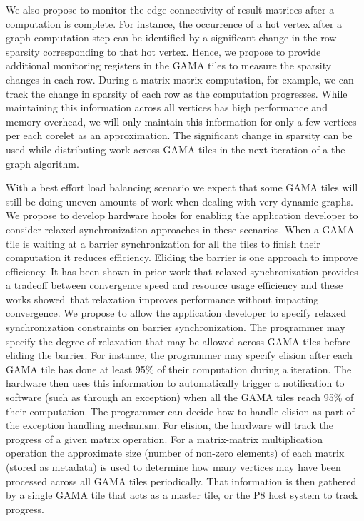 We also propose to monitor the edge connectivity of result matrices after a computation is complete. For instance, the occurrence of a hot vertex after a graph computation step can be identified by a significant change in the row sparsity corresponding to that hot vertex. Hence, we propose to provide additional monitoring registers in the GAMA tiles to measure the sparsity changes in each row. During a matrix-matrix computation, for example, we can track the change in sparsity of each row as the computation progresses. While maintaining this information across all vertices has high performance and memory overhead, we will only maintain this information for only a few vertices per each corelet as an approximation. The significant change in sparsity can be used while distributing work across GAMA tiles in the next iteration of a the graph algorithm.    

With a best effort load balancing scenario we expect that some GAMA tiles  will still be doing uneven amounts of work when dealing with very dynamic graphs.  We  propose to develop hardware hooks for enabling the application developer to consider relaxed synchronization approaches in these scenarios. When a GAMA tile is waiting at a barrier synchronization for all the tiles to finish their computation it reduces efficiency. Eliding the barrier is one approach to  improve efficiency. It has been shown in prior work that relaxed synchronization provides a tradeoff between convergence speed and resource usage efficiency and these works showed that relaxation improves performance without impacting  convergence.  We propose to allow the application developer to specify relaxed synchronization constraints on barrier synchronization. The programmer may specify the degree of relaxation that may be allowed across GAMA tiles before eliding the barrier. For instance, the programmer may specify elision after each GAMA tile has done at least 95\% of their computation during a iteration. The hardware then uses this information to automatically trigger a notification to software (such as through an exception) when all the GAMA tiles reach 95\% of their computation. The programmer can decide how to handle elision as part of the exception handling mechanism.  For elision, the hardware will track the progress of a given matrix operation. For a matrix-matrix multiplication operation the approximate size (number of non-zero elements) of each matrix  (stored as  metadata) is used to determine how many vertices may have been processed across all GAMA tiles periodically. That information is then gathered by a single GAMA tile that acts as a master tile, or the P8 host system to track progress. 


